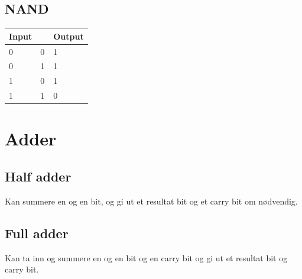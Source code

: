 \documentclass[a4paper, 10pt]{article}
\begin{document}
\subsection{NAND}
\begin{tabular}{|l|l|l|}
    \hline
    Input & ~ & Output \\ \hline
    0     & 0 & 1      \\ \hline
    0     & 1 & 1      \\ \hline
    1     & 0 & 1      \\ \hline
    1     & 1 & 0      \\ \hline
\end{tabular}


\section{Adder}
\subsection{Half adder}
Kan summere en og en bit, og gi ut et resultat bit og et carry bit om nødvendig.

\subsection{Full adder}
Kan ta inn og summere en og en bit og en carry bit og gi ut et resultat bit og carry bit.
\end{document}
